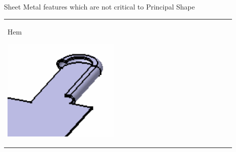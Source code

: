 \begin{frame}{Sheet Metal features which are not critical to Principal Shape}
\begin{tabular}[h]{@{} p{0.45\linewidth} p{0.45\linewidth}@{}}
Hem

\includegraphics[width=0.4\linewidth]{..//Common/images/Feature_Hem.png} \\

\end{tabular}
\end{frame}

